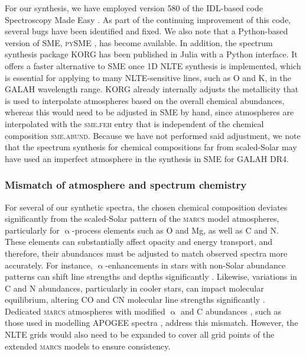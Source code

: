 \documentclass[
  journal=pasa,
  manuscript=research-paper, %
  year=2024,
  volume=37
]{cup-journal}
\newcommand{\marcs}{\textsc{marcs}\xspace}
\begin{document}
For our synthesis, we have employed version 580 of the IDL-based code Spectroscopy Made Easy \citep{Valenti1996, Piskunov2017}. As part of the continuing improvement of this code, several bugs have been identified and fixed. We also note that a Python-based version of \textsc{SME}, \textsc{pySME} \citep{Wehrhahn2023}, has become available. In addition, the spectrum synthesis package \textsc{KORG} \citep{Wheeler2023, Wheeler2024} has been published in Julia with a Python interface. It offers a faster alternative to \textsc{SME} once 1D NLTE synthesis is implemented, which is essential for applying to many NLTE-sensitive lines, such as O and K, in the GALAH wavelength range. \textsc{KORG} already internally adjusts the metallicity that is used to interpolate atmospheres based on the overall chemical abundances, whereas this would need to be adjusted in \textsc{SME} by hand, since atmospheres are interpolated with the \textsc{sme.feh} entry that is independent of the chemical composition \textsc{sme.abund}. Because we have not performed said adjustment, we note that the spectrum synthesis for chemical compositions far from scaled-Solar may have used an imperfect atmosphere in the synthesis in \textsc{SME} for GALAH DR4.

\subsubsection{Mismatch of atmosphere and spectrum chemistry}

For several of our synthetic spectra, the chosen chemical composition deviates significantly from the scaled-Solar pattern of the \marcs model atmospheres, particularly for $\upalpha$-process elements such as O and Mg, as well as C and N. These elements can substantially affect opacity and energy transport, and therefore, their abundances must be adjusted to match observed spectra more accurately. For instance, $\upalpha$-enhancements in stars with non-Solar abundance patterns can shift line strengths and depths significantly \citep{VandenBerg2012, Asplund2005}. Likewise, variations in C and N abundances, particularly in cooler stars, can impact molecular equilibrium, altering CO and CN molecular line strengths significantly \citep{Tsuji1976, Smith2013}. Dedicated \marcs atmospheres with modified $\upalpha$ and C abundances \citep{Joensson2020}, such as those used in modelling APOGEE spectra \citep{SDSSDR17}, address this mismatch. However, the NLTE grids would also need to be expanded to cover all grid points of the extended \marcs models to ensure consistency.
\end{document}
